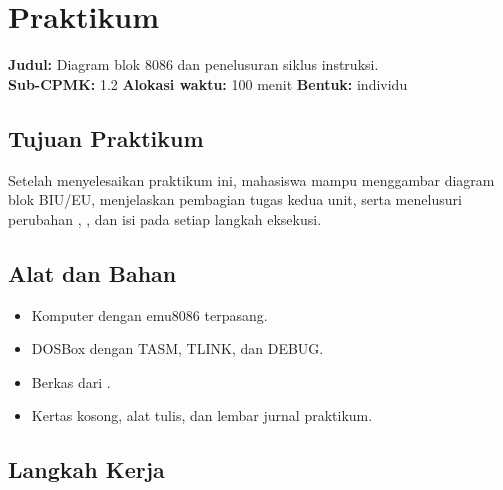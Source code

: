 \section{Praktikum}
\label{sec:praktikum-bab4}

\begin{praktikumbox}
\vspace{1.1em}
\textbf{Judul:} Diagram blok 8086 dan penelusuran siklus instruksi.\\[0.3em]
\textbf{Sub-CPMK:} 1.2 \quad\textbullet\quad
\textbf{Alokasi waktu:} 100 menit \quad\textbullet\quad
\textbf{Bentuk:} individu
\end{praktikumbox}

\subsection{Tujuan Praktikum}

Setelah menyelesaikan praktikum ini, mahasiswa mampu menggambar
diagram blok BIU/EU, menjelaskan pembagian tugas kedua unit, serta
menelusuri perubahan , , dan isi  pada
setiap langkah eksekusi.

\subsection{Alat dan Bahan}

\begin{itemize}
    \item Komputer dengan emu8086 terpasang.
    \item DOSBox dengan TASM, TLINK, dan DEBUG.
    \item Berkas  dari .
    \item Kertas kosong, alat tulis, dan lembar jurnal praktikum.
\end{itemize}

\subsection{Langkah Kerja}

